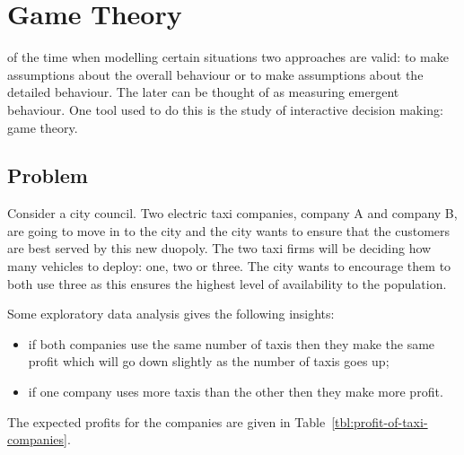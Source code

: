 \chapter[Game Theory]{Game Theory}\label{chp:game_theory}

 of the time when modelling certain situations two
approaches are valid: to make assumptions about the overall behaviour or to make
assumptions about the detailed behaviour. The later can be thought of as
measuring emergent behaviour. One tool used to do this is the study of
interactive decision making: game theory.

\section{Problem}\label{sec:game_theory_problem}

Consider a city council. Two electric taxi companies, company A and company B,
are going to move in to the city and the city wants to ensure that the customers
are best served by this new duopoly. The two taxi firms will be deciding how
many vehicles to deploy: one, two or three. The city wants to encourage them to
both use three as this ensures the highest level of availability to the
population.

Some exploratory data analysis gives the following insights:

\begin{itemize}
    \item if both companies use the same number of taxis then they make the same
        profit which will go down slightly as the number of taxis goes up;
    \item if one company uses more taxis than the other then they make more
        profit.
\end{itemize}

The expected profits for the companies are given in
Table~\ref{tbl:profit-of-taxi-companies}.

